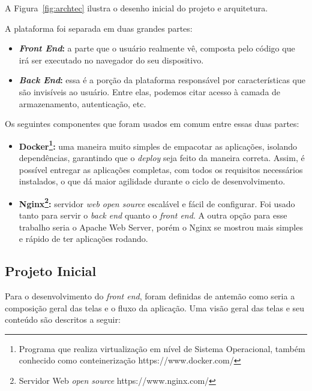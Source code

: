 \documentclass[11pt,twoside]{article}
\begin{document}
A Figura~\ref{fig:archtec} ilustra o desenho inicial do projeto e arquitetura.

A plataforma foi separada em duas grandes partes:

\begin{itemize}
  \item \textbf{\emph{Front End}:} a parte que o usuário realmente vê, composta pelo código que irá ser executado no navegador do seu dispositivo. 
  \item \textbf{\emph{Back End}:} essa é a porção da plataforma responsável por características que são invisíveis ao usuário. Entre elas, podemos citar acesso à camada de armazenamento, autenticação, etc.
\end{itemize}

Os seguintes componentes que foram usados em comum entre essas duas partes:

\begin{itemize}
  \item \textbf{Docker\footnote{Programa que realiza virtualização em nível de Sistema Operacional, também conhecido como conteinerização https://www.docker.com/}:} 
  uma maneira muito simples de empacotar as aplicações, isolando dependências, garantindo que o \emph{deploy} seja feito da maneira correta. Assim, é possível entregar as aplicações completas, com
  todos os requisitos necessários instalados, o que dá maior agilidade durante o ciclo de desenvolvimento.
  \item \textbf{Nginx\footnote{Servidor Web \emph{open source} https://www.nginx.com/}:} servidor \emph{web open source} escalável e fácil de configurar. Foi usado tanto para servir o \emph{back end} quanto o \emph{front end}. 
  A outra opção para esse trabalho seria o Apache Web Server, porém o Nginx se mostrou mais simples e rápido de ter aplicações rodando.
\end{itemize}

\subsection{Projeto Inicial}

Para o desenvolvimento do \emph{front end}, foram definidas de antemão como seria a composição geral das telas e o fluxo da aplicação. Uma visão geral das telas e seu conteúdo são descritos a seguir:
\end{document}
